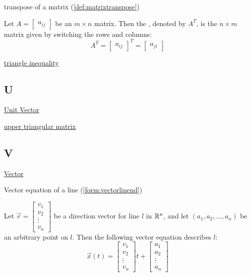\documentclass{ximera}
\begin{document}
transpose of a matrix (\ref{def:matrixtranspose})
\begin{expandable}{}{}
    Let $A=\begin{bmatrix} a _{ij}\end{bmatrix}$ be an $m\times n$ matrix. Then the , denoted by $A^{T}$, is the $n\times m$
matrix given by switching the rows and columns:
\begin{equation*}
A^{T} = \begin{bmatrix} a _{ij}\end{bmatrix}^{T}= \begin{bmatrix} a_{ji} \end{bmatrix}
\end{equation*}
\end{expandable}

\href{https://ximera.osu.edu/linearalgebradzv3/LinearAlgebraInteractiveIntro/APX-0010/main}{triangle inequality}

\subsection*{U}
\href{https://ximera.osu.edu/linearalgebradzv3/LinearAlgebraInteractiveIntro/VEC-0036/main}{Unit Vector}

\href{https://ximera.osu.edu/linearalgebradzv3/LinearAlgebraInteractiveIntro/MAT-0070/main}{upper triangular matrix}

\subsection*{V}
\href{https://ximera.osu.edu/linearalgebradzv3/LinearAlgebraInteractiveIntro/VEC-0010/main}{Vector}

Vector equation of a line (\ref{form:vectorlinend})
\begin{expandable}{}{}
    Let $\vec{v}=\begin{bmatrix}v_1\\v_2\\\vdots\\v_n\end{bmatrix}$ be a direction vector for line $l$ in $\mathbb{R}^n$, and let $(a_1, a_2,\ldots , a_n)$ be an arbitrary point on $l$.  Then the following vector equation describes $l$:
$$\vec{x}(t)=\begin{bmatrix}v_1\\v_2\\\vdots\\v_n\end{bmatrix}t+\begin{bmatrix}a_1\\a_2\\\vdots\\a_n\end{bmatrix}$$
\end{expandable}
\end{document}
